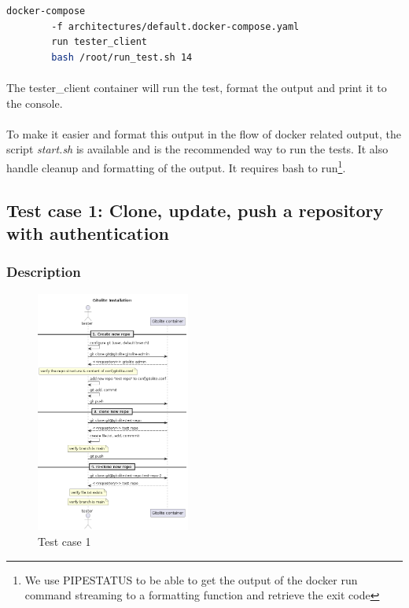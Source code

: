 \begin{lstlisting}[language=bash]
    docker-compose 
        -f architectures/default.docker-compose.yaml 
        run tester_client 
        bash /root/run_test.sh 14
\end{lstlisting}

\paragraph{}
The tester\_client container will run the test, format the output and print it to the console.

\paragraph{}
To make it easier and format this output in the flow of docker related output, the script \textit{start.sh} is available and is the recommended way to run the tests. It also handle cleanup and formatting of the output. It requires bash to run\footnote{We use PIPESTATUS to be able to get the output of the docker run command streaming to a formatting function and retrieve the exit code}.



\subsection{Test case 1: Clone, update, push a repository with authentication}
\subsubsection{Description}
\begin{figure}
    \begin{center}
        \includegraphics[width=0.45\textwidth]{prototyping/diagrams/gitolite_installation_verification}
    \end{center}
    \caption{Test case 1}
\end{figure}


